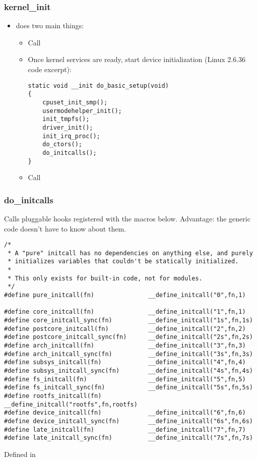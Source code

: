 \begin{frame}[fragile]
  \frametitle{kernel\_init}
  \begin{itemize}
  \item {} does two main things:
    \begin{itemize}
    \item Call 
    \item Once kernel services are ready, start device initialization
      (Linux 2.6.36 code excerpt):
\begin{verbatim}
static void __init do_basic_setup(void)
{
    cpuset_init_smp();
    usermodehelper_init();
    init_tmpfs();
    driver_init();
    init_irq_proc();
    do_ctors();
    do_initcalls();
}
\end{verbatim}
    \item Call 
    \end{itemize}
  \end{itemize}
\end{frame}

\begin{frame}[fragile]
  \frametitle{do\_initcalls}
Calls pluggable hooks registered with the macros below.
Advantage: the generic code doesn't have to know about them.
\begin{verbatim}
/*
 * A "pure" initcall has no dependencies on anything else, and purely
 * initializes variables that couldn't be statically initialized.
 *
 * This only exists for built-in code, not for modules.
 */
#define pure_initcall(fn)               __define_initcall("0",fn,1)

#define core_initcall(fn)               __define_initcall("1",fn,1)
#define core_initcall_sync(fn)          __define_initcall("1s",fn,1s)
#define postcore_initcall(fn)           __define_initcall("2",fn,2)
#define postcore_initcall_sync(fn)      __define_initcall("2s",fn,2s)
#define arch_initcall(fn)               __define_initcall("3",fn,3)
#define arch_initcall_sync(fn)          __define_initcall("3s",fn,3s)
#define subsys_initcall(fn)             __define_initcall("4",fn,4)
#define subsys_initcall_sync(fn)        __define_initcall("4s",fn,4s)
#define fs_initcall(fn)                 __define_initcall("5",fn,5)
#define fs_initcall_sync(fn)            __define_initcall("5s",fn,5s)
#define rootfs_initcall(fn)             __define_initcall("rootfs",fn,rootfs)
#define device_initcall(fn)             __define_initcall("6",fn,6)
#define device_initcall_sync(fn)        __define_initcall("6s",fn,6s)
#define late_initcall(fn)               __define_initcall("7",fn,7)
#define late_initcall_sync(fn)          __define_initcall("7s",fn,7s)
\end{verbatim}
Defined in 
\end{frame}

